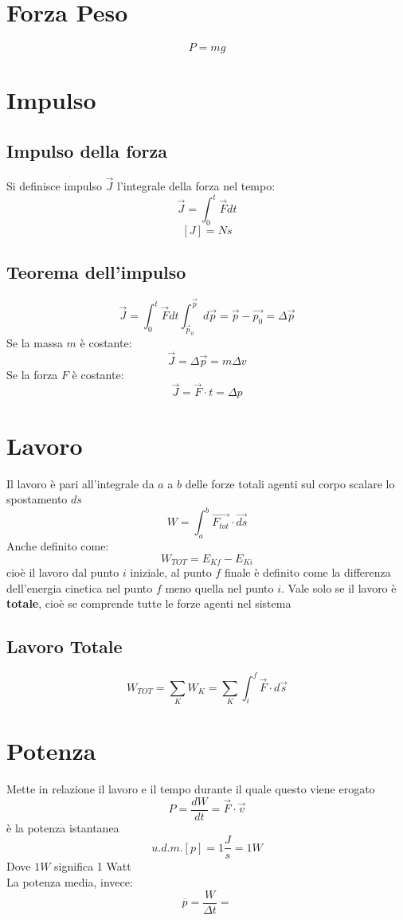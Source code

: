 \documentclass[a4paper]{report}
\begin{document}
  \section{Forza Peso}
  \[ P = mg \]

  \section{Impulso}
  \subsection{Impulso della forza}
  Si definisce impulso $ \vec{J} $ l'integrale della forza nel tempo:
  \[ \vec{J} = \int_0^t \vec{F} dt \]
  \[ [J] = N  s \]

  \subsection{Teorema dell'impulso}
  \[ \vec{J} = \int_0^t \vec{F} dt \int_{\vec{p}_0}^{\vec{p}} d\vec{p} = \vec{p} - \vec{p_0} = \Delta \vec{p} \]
  Se la massa $m$ è costante:
  \[ \vec{J} = \Delta \vec{p} = m \Delta v \]
  Se la forza $F$ è costante:
  \[ \vec{J} = \vec{F} \cdot t = \Delta p  \]

  \section{Lavoro}
  Il lavoro è pari all'integrale da $a$ a $b$ delle forze totali agenti sul corpo scalare lo spostamento $ds$
  \[ W = \int_{a}^{b} \vec{F_{tot}} \cdot \vec{ds} \]
  Anche definito come:
  \[ W_{TOT} = E_{Kf} - E_{Ki} \]
  cioè il lavoro dal punto $i$ iniziale, al punto $f$ finale è definito come la differenza dell'energia cinetica nel punto $f$ meno quella nel punto $i$. Vale solo se il lavoro è \textbf{totale}, cioè se comprende tutte le forze agenti nel sistema
  \subsection{Lavoro Totale}
  \[ W_{TOT} = \sum_K W_K = \sum_K \int_i^f \vec{F}\cdot d\vec{s} \]


  \section{Potenza}
  Mette in relazione il lavoro e il tempo durante il quale questo viene erogato
  \[ P = \frac{dW}{dt} = \vec{F} \cdot \vec{v} \]
  è la potenza istantanea
  \[ u.d.m.[p] = 1 \frac{J}{s} = 1W \]
  Dove $1W$ significa 1 Watt\\
  La potenza media, invece:
  \[ \overbar{p} = \frac{W}{\Delta t} =  \]
\end{document}
